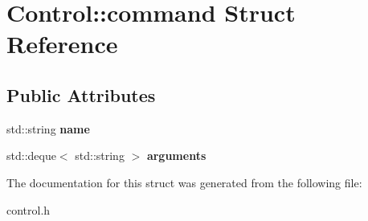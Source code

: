 \hypertarget{struct_control_1_1command}{}\section{Control\+:\+:command Struct Reference}
\label{struct_control_1_1command}
\subsection*{Public Attributes}
\begin{DoxyCompactItemize}
\item 
\mbox{\label{struct_control_1_1command_adaad3471dcaf337bc17b891ae8c4b936}} 
std\+::string {\bfseries name}
\item 
\mbox{\label{struct_control_1_1command_a466dfb7538ffbf861425b7d5b5c28b9c}} 
std\+::deque$<$ std\+::string $>$ {\bfseries arguments}
\end{DoxyCompactItemize}


The documentation for this struct was generated from the following file\+:\begin{DoxyCompactItemize}
\item 
control.\+h\end{DoxyCompactItemize}
